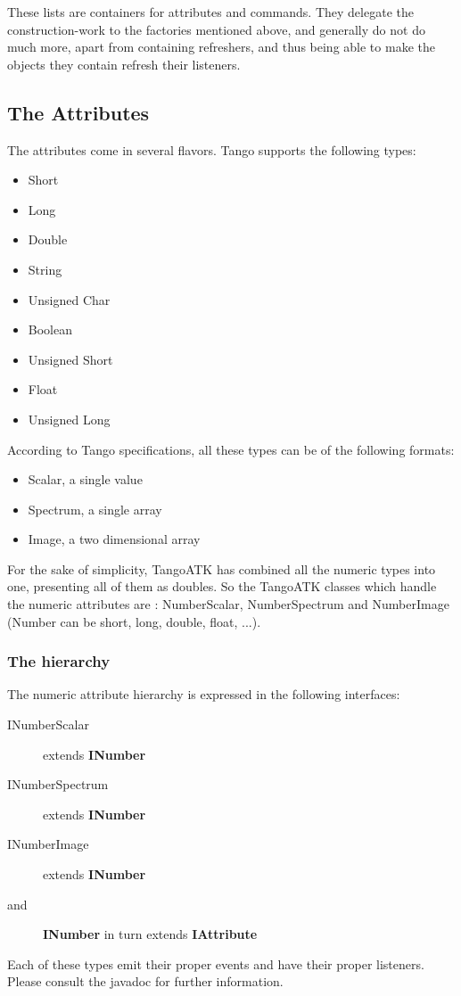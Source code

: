 These lists are containers for attributes and commands. They delegate
the construction-work to the factories mentioned above, and generally
do not do much more, apart from containing refreshers, and thus being
able to make the objects they contain refresh their listeners.


\subsection{The Attributes}

The attributes come in several flavors. Tango supports
the following types:
\begin{itemize}
\item Short 
\item Long 
\item Double
\item String 
\item Unsigned Char
\item Boolean
\item Unsigned Short
\item Float
\item Unsigned Long
\end{itemize}
According to Tango specifications, all these types can be of the following
formats:
\begin{itemize}
\item Scalar, a single value 
\item Spectrum, a single array 
\item Image, a two dimensional array 
\end{itemize}
For the sake of simplicity, TangoATK has combined all the numeric
types into one, presenting all of them as doubles. So the TangoATK
classes which handle the numeric attributes are : NumberScalar, NumberSpectrum
and NumberImage (Number can be short, long, double, float, ...).


\subsubsection{The hierarchy}

The numeric attribute hierarchy is expressed in the following interfaces:
\begin{description}
\item [{INumberScalar}] extends \textbf{INumber}
\item [{INumberSpectrum}] extends \textbf{INumber}
\item [{INumberImage}] extends \textbf{INumber}
\item [{\textmd{and}}] \textbf{INumber} in turn extends \textbf{IAttribute}
~
\end{description}
Each of these types emit their proper events and have their proper
listeners. Please consult the javadoc for further information.


